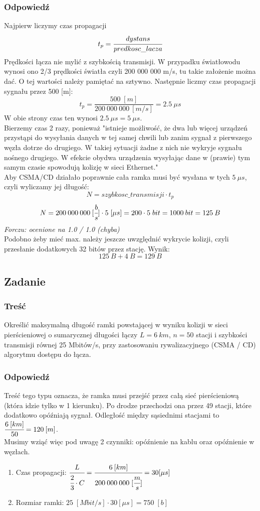 \documentclass[a4paper,twoside]{article}
\begin{document}
\subsubsection{Odpowiedź}
Najpierw liczymy czas propagacji $$ t_p = \cfrac{dystans}{predkosc\_lacza} $$
Prędkości łącza nie mylić z szybkością transmisji. W przypadku światłowodu wynosi ono 2/3 prędkości światła czyli 200 000 000 m/s, tu takie założenie można dać. O tej wartości należy pamiętać na sztywno. Następnie liczmy czas propagacji sygnału przez 500 [m]:
$$ t_p=\frac{500\;[m]}{200\:000\:000\:[m/s]}=2.5\:\mu s $$
W obie strony czas ten wynosi $ 2.5\:\mu s = 5\:\mu s$.\\
Bierzemy czas 2 razy, ponieważ "istnieje możliwość, że dwa lub więcej urządzeń przystąpi do wysyłania danych w tej samej chwili lub zanim sygnał z pierwszego węzła dotrze do drugiego. W takiej sytuacji żadne z nich nie wykryje sygnału nośnego drugiego. W efekcie obydwa urządzenia wysyłając dane w (prawie) tym samym czasie spowodują kolizję w sieci Ethernet."\\
Aby CSMA/CD działało poprawnie cała ramka musi być wysłana w tych $5\:\mu s$, czyli wyliczamy jej długość:
$$ N=szybkosc\_transmisji\cdot t_p $$
$$ N=200\:000\:000\:[\cfrac{b}{s}]\cdot5\;[\mu s] =200\cdot5\;bit=1000\:bit=125\:B $$
{\small \emph{Forczu: ocenione na 1.0 / 1.0 (chyba)}}\\
Podobno żeby mieć max. należy jeszcze uwzględnić wykrycie kolizji, czyli przesłanie dodatkowych 32 bitów przez stację. Wynik:
$$ 125\:B+4\:B=129\:B $$

\subsection{Zadanie}
\subsubsection{Treść}
Określić maksymalną długość ramki powstającej w wyniku kolizji w sieci pierścieniowej o sumarycznej długości łączy $ L=6\:km $, $ n=50 $ stacji i szybkości transmisji równej 25 Mbitów/s, przy zastosowaniu rywalizacyjnego (CSMA / CD) algorytmu dostępu do łącza.
\subsubsection{Odpowiedź}
Treść tego typu oznacza, że ramka musi przejść przez całą sieć pierścieniową (która idzie tylko w 1 kierunku). Po drodze przechodzi ona przez 49 stacji, które dodatkowo opóźniają sygnał. Odległość między sąsiednimi stacjami to $ \cfrac{6\:[km]}{50}=120\:[m]  $.\\
Musimy wziąć więc pod uwagę 2 czynniki: opóźnienie na kablu oraz opóźnienie w węzłach.
\begin{enumerate}
	\item Czas propagacji: $ \cfrac{L}{\cfrac{2}{3}\cdot C} = \cfrac{6\:[km]}{200\:000\:000\;[\cfrac{m}{s}]}=30 [\mu s]$
	\item Rozmiar ramki: $ 25\;[Mbit/s] \cdot 30 [\mu s]=750\;[b] $
\end{enumerate}
\newpage
\end{document}
